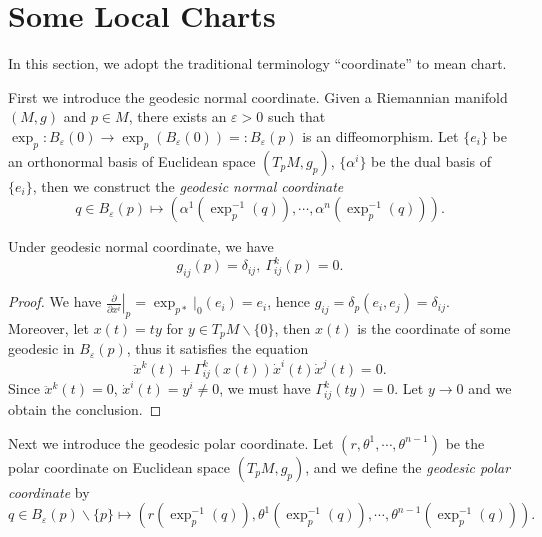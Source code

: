 \section{Some Local Charts}
In this section, we adopt the traditional terminology ``coordinate'' to mean chart.

First we introduce the geodesic normal coordinate.
Given a Riemannian manifold $(M,g)$ and $p\in M$, there exists an $\varepsilon>0$ such that $\exp_p:B_\varepsilon(0)\to\exp_p(B_\varepsilon(0))=:B_\varepsilon(p)$ is an diffeomorphism.
Let $\{e_i\}$ be an orthonormal basis of Euclidean space $(T_pM,g_p)$, $\{\alpha^i\}$ be the dual basis of $\{e_i\}$, then we construct the \emph{geodesic normal coordinate}
\[q\in B_\varepsilon(p)\mapsto(\alpha^1(\exp_p^{-1}(q)),\cdots,\alpha^n(\exp_p^{-1}(q))).\]

\begin{prop}
    Under geodesic normal coordinate, we have
    \[g_{ij}(p)=\delta_{ij},\ \Gamma^k_{ij}(p)=0.\]
\end{prop}
\begin{proof}
    We have $\left.\frac{\partial{}}{\partial{x^i}}\right|_p=\exp_{p*}|_0(e_i)=e_i$, hence $g_{ij}=\delta_p(e_i,e_j)=\delta_{ij}$.
    Moreover, let $x(t)=ty$ for $y\in T_pM\backslash\{0\}$, then $x(t)$ is the coordinate of some geodesic in $B_\varepsilon(p)$, thus it satisfies the equation
    \[\ddot{x}^k(t)+\Gamma^k_{ij}(x(t))\dot{x}^i(t)\dot{x}^j(t)=0.\]
    Since $\ddot{x}^k(t)=0$, $\dot{x}^i(t)=y^i\neq 0$, we must have $\Gamma^k_{ij}(ty)=0$.
    Let $y\to 0$ and we obtain the conclusion.
\end{proof}

Next we introduce the geodesic polar coordinate.
Let $(r,\theta^1,\cdots,\theta^{n-1})$ be the polar coordinate on Euclidean space $(T_pM,g_p)$, and we define the \emph{geodesic polar coordinate} by
\[q\in B_\varepsilon(p)\backslash\{p\}\mapsto(r(\exp_p^{-1}(q)),\theta^1(\exp_p^{-1}(q)),\cdots,\theta^{n-1}(\exp_p^{-1}(q))).\]

